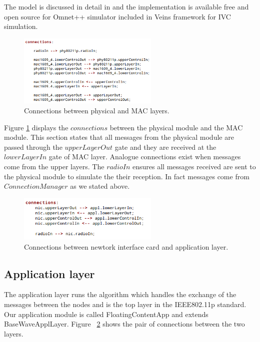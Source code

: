 The model is discussed in detail in \cite{eckhoff2012multi} and the
implementation is available free and open source for Omnet++ simulator included
in Veins framework for IVC simulation.

\begin{figure}
	\centering
	\includegraphics[width=0.6\textwidth]{img/nic80211p_connections}
	\caption{Connections between physical and MAC layers.}
	\label{fig:nic80211p_connections}
\end{figure}
 
Figure \ref{fig:nic80211p_connections} displays the $connections$ between
the physical module and the MAC module. This section states that all messages
from the physical module are passed through the $upperLayerOut$ gate and they
are received at the $lowerLayerIn$ gate of MAC layer. Analogue connections exist
when messages come from the upper layers. The $radioIn$ ensures all messages
received are sent to the physical module to simulate the their reception. In
fact messages come from $ConnectionManager$ as we stated above.

\begin{figure}[t]
	\centering
	\includegraphics[width=0.6\textwidth]{img/appl_connections}
	\caption{Connections between newtork interface card and application
	layer.}
	\label{fig:appl_connections}
\end{figure}

\subsection{Application layer}

The application layer runs the algorithm which handles the exchange of the
messages between the nodes and is the top layer in the IEEE802.11p standard. Our
application module is called FloatingContentApp and extends BaseWaveApplLayer.
Figure ~\ref{fig:appl_connections} shows the pair of connections between the two
layers.

